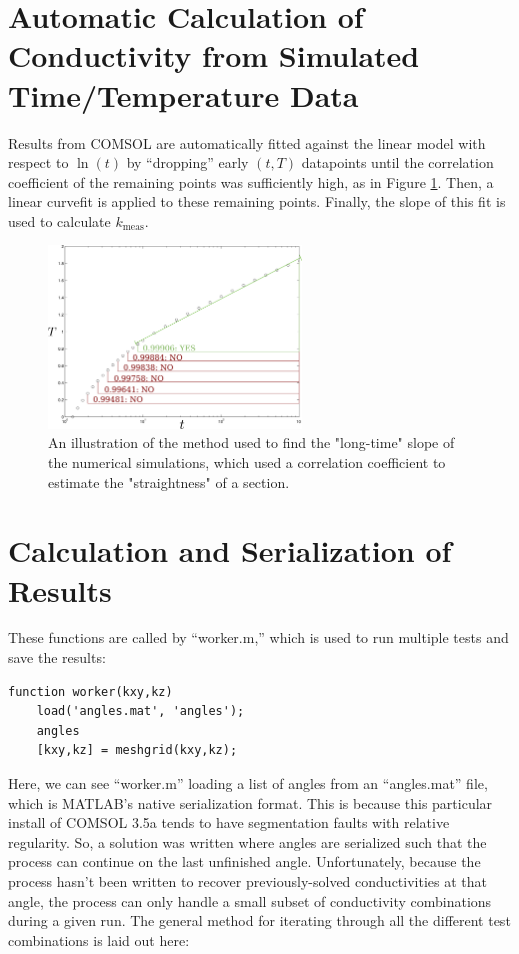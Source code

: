 \section{Automatic Calculation of Conductivity from Simulated Time/Temperature Data}

Results from COMSOL are automatically fitted against the linear model with
respect to \(\ln(t)\) by ``dropping'' early \((t,T)\) datapoints until the
correlation coefficient of the remaining points was sufficiently high, as in Figure \ref{fig:curvefit}. Then, a
linear curvefit is applied to these remaining points. Finally, the slope of this fit is
used to calculate \(k_{\textrm{meas}}\).

\begin{figure}[h]
\centering
\includegraphics[width=0.6\textwidth]{fig/curvefit.png}
\caption{An illustration of the method used to find the "long-time" slope of the numerical simulations, which used a correlation coefficient to estimate the "straightness" of a section.}
\label{fig:curvefit}
\end{figure}

\section{Calculation and Serialization of Results}

These functions are called by ``worker.m,'' which is used to run multiple
tests and save the results:

\small
\begin{verbatim}
function worker(kxy,kz)
    load('angles.mat', 'angles');
    angles
    [kxy,kz] = meshgrid(kxy,kz);
\end{verbatim}
\normalsize

Here, we can see ``worker.m'' loading a list of angles from an ``angles.mat''
file, which is MATLAB's native serialization format. This is because this particular install of COMSOL 3.5a
tends to have segmentation faults with relative regularity. So, a
solution was written where angles are serialized such that the
process can continue on the last unfinished angle. Unfortunately, because the
process hasn't been written to recover previously-solved conductivities at that
angle, the process can only handle a small subset of conductivity combinations
during a given run. The general method for iterating through all the different
test combinations is laid out here:

